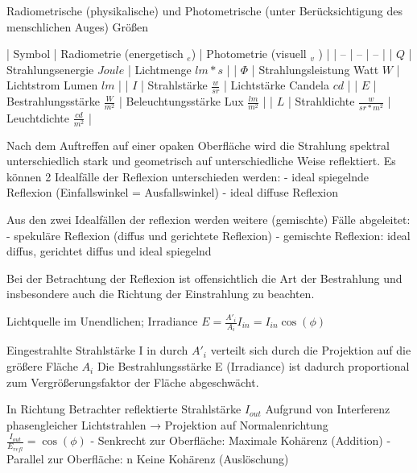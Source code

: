 \documentclass[10pt,landscape]{article}
\makeatletter
\renewcommand{\subsection}{\@startsection{subsection}{2}{0mm}%
                                {-1explus -.5ex minus -.2ex}%
                                {0.5ex plus .2ex}%
                                {\normalfont\normalsize\bfseries}}
\makeatother
\begin{document}
\begin{multicols}{3}
Radiometrische (physikalische) und Photometrische (unter Berücksichtigung des menschlichen Auges) Größen

| Symbol | Radiometrie (energetisch $_e$) | Photometrie (visuell $_v$ ) |
| -- | -- | -- |
| $Q$ | Strahlungsenergie $Joule$ | Lichtmenge $lm*s$ |
| $\Phi$ | Strahlungsleistung Watt $W$ | Lichtstrom Lumen $lm$ |
| $I$ | Strahlstärke $\frac{w}{sr}$ | Lichtstärke Candela $cd$ |
| $E$ | Bestrahlungsstärke $\frac{W}{m^2}$ | Beleuchtungsstärke Lux $\frac{lm}{m^2}$ |
| $L$ | Strahldichte $\frac{w}{sr*m^2}$ | Leuchtdichte $\frac{cd}{m^2}$ |



Nach dem Auftreffen auf einer opaken Oberfläche wird die Strahlung spektral
unterschiedlich stark und geometrisch auf unterschiedliche Weise reflektiert. Es
können 2 Idealfälle der Reflexion unterschieden werden:
- ideal spiegelnde Reflexion (Einfallswinkel = Ausfallswinkel)
- ideal diffuse Reflexion

Aus den zwei Idealfällen der reflexion werden weitere (gemischte) Fälle abgeleitet:
- spekuläre Reflexion (diffus und gerichtete Reflexion)
- gemischte Reflexion: ideal diffus, gerichtet diffus und ideal spiegelnd

Bei der Betrachtung der Reflexion ist offensichtlich die Art der Bestrahlung und
insbesondere auch die Richtung der Einstrahlung zu beachten.




Lichtquelle im Unendlichen; Irradiance $E=\frac{A'_i}{A_i}I_{in}=I_{in}\cos(\phi)$

Eingestrahlte Strahlstärke I in durch $A'_i$ verteilt sich durch die Projektion auf die größere Fläche $A_i$ Die Bestrahlungsstärke E (Irradiance) ist dadurch proportional zum Vergrößerungsfaktor der Fläche abgeschwächt.

In Richtung Betrachter reflektierte Strahlstärke $I_{out}$ Aufgrund von Interferenz phasengleicher Lichtstrahlen → Projektion auf Normalenrichtung $\frac{I_{out}}{E_{refl}}=\cos(\phi)$
- Senkrecht zur Oberfläche: Maximale Kohärenz (Addition)
- Parallel zur Oberfläche: n Keine Kohärenz (Auslöschung)


\end{multicols}
\end{document}
